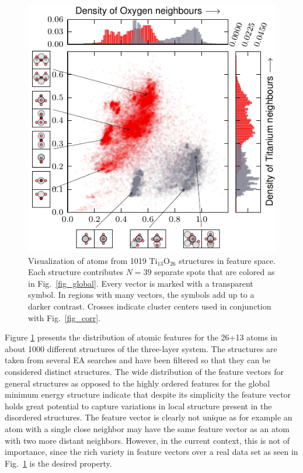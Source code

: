 \documentclass[aip,amsmath,amssymb,reprint]{revtex4-1}
\begin{document}
\begin{figure}[tb]
    \centering
    \includegraphics[width=1.0\columnwidth]{fig3-scatterplot.pdf}
    \caption{Visualization of atoms from 1019 Ti$_{13}$O$_{26}$ structures in feature space. Each structure contributes $N=39$ separate spots that are colored as in Fig.\ \protect\ref{fig_global}. Every vector is
marked with a transparent symbol. In regions with many vectors, the symbols add up to a darker contrast. Crosses indicate cluster centers used in conjunction with Fig.\ \protect\ref{fig_corr}.}
    \label{fig_feature}
\end{figure}

Figure \ref{fig_feature} presents the distribution of atomic features
for the 26+13 atoms in about 1000 different structures of the
three-layer system. The structures are taken from several EA searches
and have been filtered so that they can be considered distinct
structures. The wide distribution of the feature vectors for general
structures as opposed to the highly ordered features for the global
minimum energy structure indicate that despite its simplicity the
feature vector holds great potential to capture variations in local
structure present in the disordered structures. The feature vector is
clearly not unique as for example an atom with a single close neighbor may have the
same feature vector as an atom with two more distant neighbors. However, in the
current context, this is not of importance, since the rich variety in feature
vectors over a real data set as seen in Fig.\  \ref{fig_feature} is the
desired property.
\end{document}
